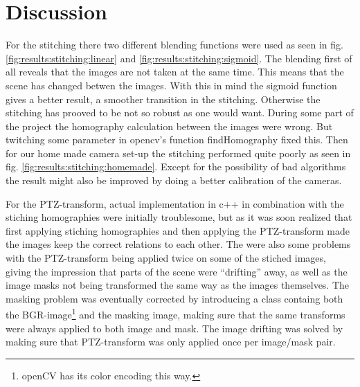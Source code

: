 \section{Discussion}
For the stitching there two different blending functions were used as seen in fig. \ref{fig:results:stitching:linear} and \ref{fig:results:stitching:sigmoid}. The blending first of all reveals that the images are not taken at the same time. This means that the scene has changed betwen the images. With this in mind the sigmoid function gives a better result, a smoother transition in the stitching. Otherwise the stitching has prooved to be not so robust as one would want. During some part of the project the homography calculation between the images were wrong. But twitching some parameter in opencv's function findHomography fixed this. Then for our home made camera set-up the stitching performed quite poorly as seen in fig. \ref{fig:results:stitching:homemade}. Except for the possibility of bad algorithms the result might also be improved by doing a better calibration of the cameras.

For the PTZ-transform, actual implementation in c++ in combination with the stiching homographies were initially troublesome, but as it was soon realized that first applying stiching homographies and then applying the PTZ-transform made the images keep the correct relations to each other. 
The were also some problems with the PTZ-transform being applied twice on some of the stiched images, giving the impression that parts of the scene were ``drifting'' away, as well as the image masks not being transformed the same way as the images themselves.
The masking problem was eventually corrected by introducing a class containg both the BGR-image\footnote{openCV has its color encoding this way.} and the masking image, making sure that the same transforms were always applied to both image and mask. The image drifting was solved by making sure that PTZ-transform was only applied once per image/mask pair. 
